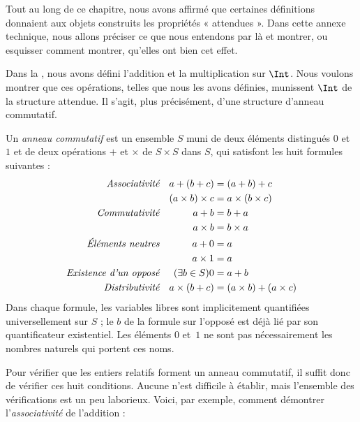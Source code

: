\documentclass[../../../include/open-logic-section]{subfiles}
\begin{document}

Tout au long de ce chapitre, nous avons affirmé que certaines définitions
donnaient aux objets construits les propriétés « attendues ». Dans cette
annexe technique, nous allons préciser ce que nous entendons par là et
montrer, ou esquisser comment montrer, qu'elles ont bien cet effet.

Dans la , nous avons défini l'addition et la multiplication
sur $\Int$. Nous voulons montrer que ces opérations, telles que nous
les avons définies, munissent $\Int$ de la structure attendue.
Il s'agit, plus précisément, d'une structure d'anneau commutatif.

\begin{defn}
Un \emph{anneau commutatif} est un ensemble $S$ muni de deux éléments
distingués $0$ et $1$ et de deux opérations $+$ et $\times$ de
$S\times S$ dans $S$, qui satisfont les huit formules suivantes :
\begin{align*}
  \emph{Associativité}&&a + (b+ c) & = (a + b) + c \\
  && (a \times b) \times c & = a \times (b\times c)\\
  \emph{Commutativité}&&a + b &= b+ a  \\
  && a \times b&= b\times a\\
  \emph{Éléments neutres}&&a + 0 &= a \\
  && a \times 1 &= a\\
  \emph{Existence d'un opposé}&&(\exists b\in S)0&=a + b\\
  \emph{Distributivité}&&a \times (b+ c ) &= (a \times b) + (a \times c)
\end{align*}
Dans chaque formule, les variables libres sont implicitement quantifiées
universellement sur $S$ ; le $b$ de la formule sur l'opposé est déjà lié
par son quantificateur existentiel. Les éléments $0$ et~$1$ ne sont pas
nécessairement les nombres naturels qui portent ces noms.
\end{defn}

Pour vérifier que les entiers relatifs forment un anneau commutatif, il
suffit donc de vérifier ces huit conditions. Aucune n'est difficile à
établir, mais l'ensemble des vérifications est un peu laborieux. Voici,
par exemple, comment démontrer l'\emph{associativité} de l'addition :
\end{document}
